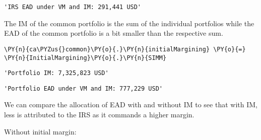             \begin{tcolorbox}[breakable, size=fbox, boxrule=.5pt, pad at break*=1mm, opacityfill=0]
\begin{Verbatim}[commandchars=\\\{\}]
'IRS EAD under VM and IM: 291,441 USD'
\end{Verbatim}
\end{tcolorbox}
        
    The IM of the common portfolio is the sum of the individual portfolios
while the EAD of the common portfolio is a bit smaller than the
respective sum.

    \begin{tcolorbox}[breakable, size=fbox, boxrule=1pt, pad at break*=1mm,colback=cellbackground, colframe=cellborder]
\begin{Verbatim}[commandchars=\\\{\}]
\PY{n}{ca\PYZus{}common}\PY{o}{.}\PY{n}{initialMargining} \PY{o}{=} \PY{n}{InitialMargining}\PY{o}{.}\PY{n}{SIMM}
\end{Verbatim}
\end{tcolorbox}

            \begin{tcolorbox}[breakable, size=fbox, boxrule=.5pt, pad at break*=1mm, opacityfill=0]
\begin{Verbatim}[commandchars=\\\{\}]
'Portfolio IM: 7,325,823 USD'
\end{Verbatim}
\end{tcolorbox}
        
            \begin{tcolorbox}[breakable, size=fbox, boxrule=.5pt, pad at break*=1mm, opacityfill=0]
\begin{Verbatim}[commandchars=\\\{\}]
'Portfolio EAD under VM and IM: 777,229 USD'
\end{Verbatim}
\end{tcolorbox}
        
    We can compare the allocation of EAD with and without IM to see that
with IM, less is attributed to the IRS as it commands a higher margin.

    Without initial margin:

